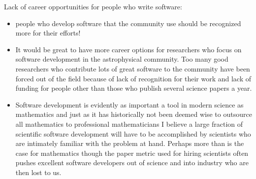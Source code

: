 \begin{appendix}
\begin{itemize}
\end{itemize}

Lack of career opportunities for people who write software:

\begin{itemize}
\item{people who develop software that the community use should be recognized more for their efforts!}
\item{It would be great to have more career options for researchers who focus on software development in the astrophysical community.  Too many good researchers who contribute lots of great software to the community have been forced out of the field because of lack of recognition for their work and lack of funding for people other than those who publish several science papers a year.}
\item{Software development is evidently as important a tool in modern science as mathematics and just as it has historically not been deemed wise to outsource all mathematics to professional mathematicians I believe a large fraction of scientific software development will have to be accomplished by scientists who are intimately familiar with the problem at hand. Perhaps more than is the case for mathematics though the paper metric used for hiring scientists often pushes excellent software developers out of science and into industry who are then lost to us.}
\end{itemize}

\end{appendix}
